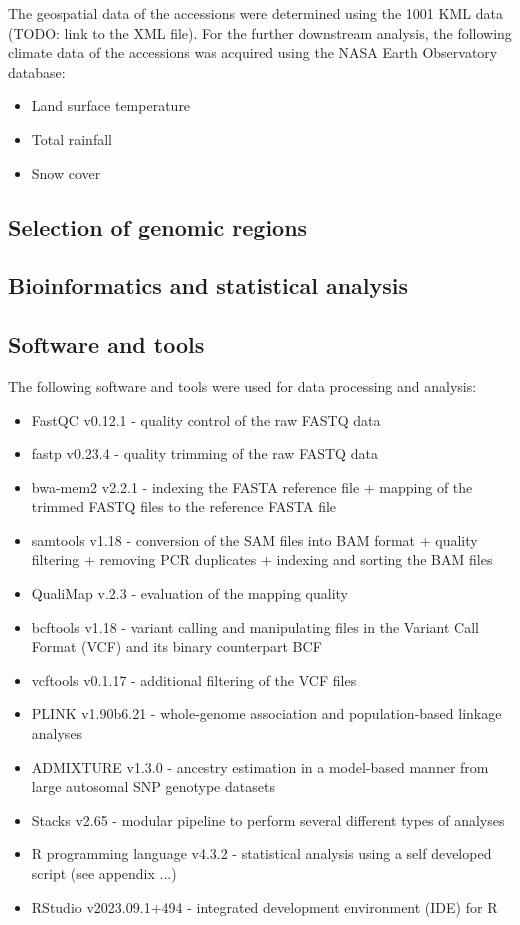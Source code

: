 The geospatial data of the accessions were determined using the 1001 KML data (TODO: link to the XML file). For the further downstream analysis, the following climate data of the accessions was acquired using the NASA Earth Observatory database:
\begin{itemize}
    \item Land surface temperature
    \item Total rainfall
    \item Snow cover
\end{itemize}

\subsection{Selection of genomic regions}

\subsection{Bioinformatics and statistical analysis}

\subsection{Software and tools}

The following software and tools were used for data processing and analysis:
\begin{itemize}
    \item FastQC v0.12.1 - quality control of the raw FASTQ data
    \item fastp v0.23.4 - quality trimming of the raw FASTQ data
    \item bwa-mem2 v2.2.1 - indexing the FASTA reference file + mapping of the trimmed FASTQ files to the reference FASTA file
    \item samtools v1.18 - conversion of the SAM files into BAM format + quality filtering + removing PCR duplicates + indexing and sorting the BAM files
    \item QualiMap v.2.3 - evaluation of the mapping quality
    \item bcftools v1.18 - variant calling and manipulating files in the Variant Call Format (VCF) and its binary counterpart BCF
    \item vcftools v0.1.17 - additional filtering of the VCF files
    \item PLINK v1.90b6.21 - whole-genome association and population-based linkage analyses
    \item ADMIXTURE v1.3.0 - ancestry estimation in a model-based manner from large autosomal SNP genotype datasets
    \item Stacks v2.65 - modular pipeline to perform several different types of analyses
    \item R programming language v4.3.2 - statistical analysis using a self developed script (see appendix ...)
    \item RStudio v2023.09.1+494 - integrated development environment (IDE) for R
\end{itemize}

